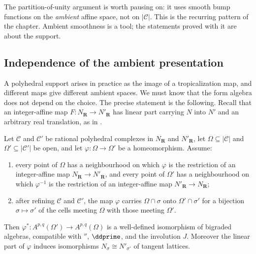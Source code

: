 The partition-of-unity argument is worth pausing on: it uses smooth bump
functions on the \emph{ambient} affine space, not on $|\mathscr C|$.  This is
the recurring pattern of the chapter.  Ambient smoothness is a tool;
the statements proved with it are about the support.

\subsection{Independence of the ambient presentation}
\label{sec:ch10-presentation}

A polyhedral support arises in practice as the image of a tropicalization
map, and different maps give different ambient spaces.  We must know that the
form algebra does not depend on the choice.  The precise statement is the
following.  Recall that an integer-affine map $F:N_{\mathbf R}\to
N'_{\mathbf R}$ has linear part carrying $N$ into $N'$ and an arbitrary real
translation, as in .

\begin{theorem}
\label{thm:ch10-forms-presentation-independent}
Let $\mathscr C$ and $\mathscr C'$ be rational polyhedral complexes in
$N_{\mathbf R}$ and $N'_{\mathbf R}$, let $\Omega\subseteq|\mathscr C|$ and
$\Omega'\subseteq|\mathscr C'|$ be open, and let
$\varphi:\Omega\to\Omega'$ be a homeomorphism.  Assume:
\begin{enumerate}
\item\label{itm:ch10-pres-local} every point of $\Omega$ has a neighbourhood
      on which $\varphi$ is the restriction of an integer-affine map
      $N_{\mathbf R}\to N'_{\mathbf R}$, and every point of $\Omega'$ has a
      neighbourhood on which $\varphi^{-1}$ is the restriction of an
      integer-affine map $N'_{\mathbf R}\to N_{\mathbf R}$;
\item\label{itm:ch10-pres-cells} after refining $\mathscr C$ and
      $\mathscr C'$, the map $\varphi$ carries $\Omega\cap\sigma$ onto
      $\Omega'\cap\sigma'$ for a bijection $\sigma\mapsto\sigma'$ of the
      cells meeting $\Omega$ with those meeting $\Omega'$.
\end{enumerate}
Then $\varphi^*:A^{p,q}(\Omega')\to A^{p,q}(\Omega)$ is a well-defined
isomorphism of bigraded algebras, compatible with $\dprime$, $\ddprime$, and
the involution $J$.  Moreover the linear part of $\varphi$ induces
isomorphisms $N_{\sigma}\cong N'_{\sigma'}$ of tangent lattices.
\end{theorem}

